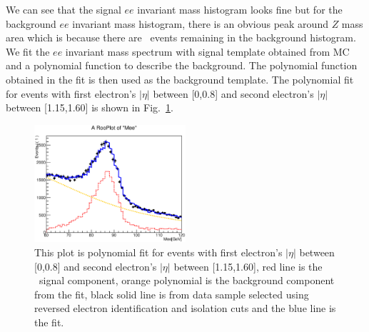  We can see that the signal $ee$ invariant mass histogram looks fine
 but for the background $ee$ invariant mass histogram, there is an
 obvious peak around $Z$ mass area which is because there are
 \Zee\ events remaining in the background histogram. We fit the $ee$
 invariant mass spectrum with signal template obtained from MC and a
 polynomial function to describe the background. The polynomial
 function obtained in the fit is then used as the background
 template. The polynomial fit for events with first electron's
 $|\eta|$ between [0,0.8] and second electron's $|\eta|$ between
 [1.15,1.60] is shown in Fig.~\ref{fig:Polynomialac}.
\begin{figure}[htp]
\centering
\includegraphics[width=0.5\textwidth]{figures/ChargeMisID/Tot_Polynomial_0_2.eps}
\caption{This plot is polynomial fit for events with first electron's
  $|\eta|$ between [0,0.8] and second electron's $|\eta|$ between
  [1.15,1.60], red line is the \Zee\ signal component, orange
  polynomial is the background component from the fit, black solid
  line is from data sample selected using reversed electron
  identification and isolation cuts and the blue line is the fit.}
\label{fig:Polynomialac}
\end{figure} 

